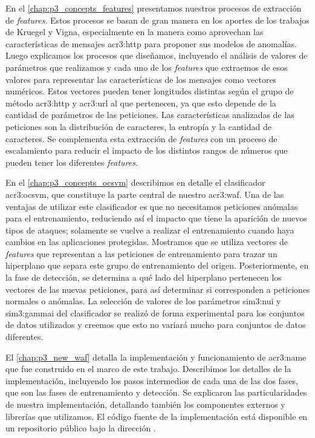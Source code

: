 En el \autoref{chap:p3_concepts_features} presentamos nuestros procesos
de extracción de \textit{features}. Estos procesos se basan de gran manera
en los aportes de los trabajos de Kruegel y Vigna, especialmente en la
manera como aprovechan las características de mensajes \gls{acr3:http}
para proponer sus modelos de anomalías. Luego explicamos los procesos que
diseñamos, incluyendo el análisis de valores de parámetros que realizamos
y cada uno de los \textit{features} que extraemos de esos valores para
representar las características de los mensajes como vectores numéricos.
Estos vectores pueden tener longitudes distintas según el grupo de método
\gls{acr3:http} y \gls{acr3:url} al que pertenecen, ya que esto depende
de la cantidad de parámetros de las peticiones.
Las características analizadas de las peticiones son la distribución de
caracteres, la entropía y la cantidad de caracteres. Se complementa esta
extracción de \textit{features} con un proceso de escalamiento para reducir
el impacto de los distintos rangos de números que pueden tener los diferentes
\textit{features}.

En el \autoref{chap:p3_concepts_ocsvm} describimos en detalle el
clasificador \gls{acr3:ocsvm}, que constituye la parte central de nuestro
\gls{acr3:waf}. Una de las ventajas de utilizar este clasificador es que
no necesitamos peticiones anómalas para el entrenamiento, reduciendo así
el impacto que tiene la aparición de nuevos tipos de ataques; solamente
se vuelve a realizar el entrenamiento cuando haya cambios en las aplicaciones
protegidas.
Mostramos que se utiliza vectores de \textit{features} que representan
a las peticiones de entrenamiento para trazar un hiperplano que separa
este grupo de entrenamiento del origen. Posteriormente, en la fase de
detección, se determina a qué lado del hiperplano pertenecen los vectores
de las nuevas peticiones, para así determinar si corresponden a peticiones
normales o anómalas.
La selección de valores de los parámetros \gls{sim3:nui} y \gls{sim3:gammai}
del clasificador se realizó de forma experimental para los conjuntos de
datos utilizados y creemos que esto no variará mucho para conjuntos de
datos diferentes.

El \autoref{chap:p3_new_waf} detalla la implementación y funcionamiento
de \gls{acr3:name} que fue construido en el marco de este trabajo.
Describimos los detalles de la implementación, incluyendo los pasos
intermedios de cada una de las dos fases, que son las fases de entrenamiento
y detección. Se explicaron las particularidades de nuestra implementación,
detallando también los componentes externos y librerías que utilizamos.
El código fuente de la implementación está disponible en un repositorio
público bajo la dirección \TheRepoUrl.

